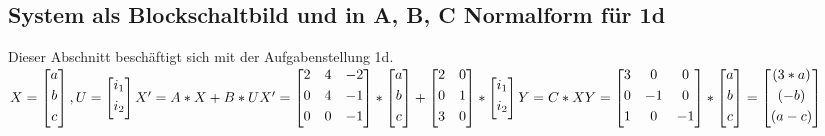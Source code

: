 \documentclass[11pt, a4paper, twoside]{article}   	%
\begin{document}
\subsection{System als Blockschaltbild und in A, B, C Normalform für 1d}
Dieser Abschnitt beschäftigt sich mit der Aufgabenstellung 1d.  
\newline
$
X = \begin{bmatrix}
	a \\[0.3em]
	b \\[0.3em]
	c \\[0.3em]
\end{bmatrix}
,
U = \begin{bmatrix}
	i_1 \\[0.3em]
	i_2 \\[0.3em]
\end{bmatrix}
\newline
\newline
\newline
X'=A*X+B*U
\newline
\newline
X'= \begin{bmatrix}
	2 & 4 & -2 \\[0.3em]
	0 & 4 & -1 \\[0.3em]
	0 & 0 & -1 \\[0.3em]
\end{bmatrix}
*
\begin{bmatrix}
	a \\[0.3em]
	b \\[0.3em]
	c \\[0.3em]
\end{bmatrix}
+
\begin{bmatrix}
	2 & 0 \\[0.3em]
	0 & 1 \\[0.3em]
	3 & 0 \\[0.3em]
\end{bmatrix}
*
\begin{bmatrix}
	i_1 \\[0.3em]
	i_2 \\[0.3em]
\end{bmatrix}
\newline
\newline
\newline
\newline
Y=C*X
\newline
\newline
Y=
\begin{bmatrix}
	3 & 0 & 0 \\[0.3em]
	0 & -1 & 0 \\[0.3em]
	1 & 0 & -1 \\[0.3em]
\end{bmatrix}
*
\begin{bmatrix}
	a \\[0.3em]
	b \\[0.3em]
	c \\[0.3em]
\end{bmatrix}
=
\begin{bmatrix}
	(3*a) \\[0.3em]
	(-b) \\[0.3em]
	(a-c) \\[0.3em]
\end{bmatrix}
$
\end{document}
